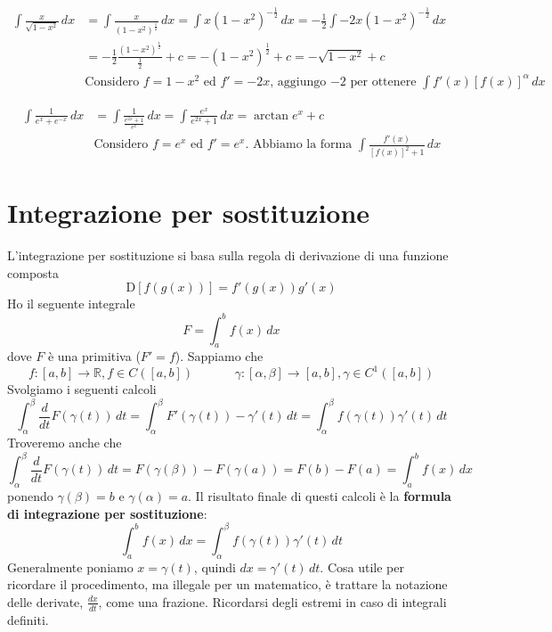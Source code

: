 \documentclass[11pt]{article}
\begin{document}
\begin{align*} \int \frac{x}{\sqrt{1-x^2}}\,dx&=\int \frac{x}{(1-x^2)^{\frac{1}{2}}}\,dx=\int x (1-x^2)^{-\frac{1}{2}}\,dx=-\frac{1}{2} \int -2x (1-x^2)^{-\frac{1}{2}}\,dx\\&=-\frac{1}{2} \frac{(1-x^2)^{\frac{1}{2}}}{\frac{1}{2}}+c=-(1-x^2)^{\frac{1}{2}}+c=-\sqrt{1-x^2}+c\\&\text{Considero $f=1-x^2$ ed $f'=-2x$, aggiungo $-2$ per ottenere $\int f'(x) [f(x)]^\alpha\,dx$}\end{align*}

\begin{align*} \int \frac{1}{e^x+e^{-x}}\,dx&=\int \frac{1}{\frac{e^{2x}+1}{e^x}}\,dx=\int \frac{e^x}{e^{2x}+1}\,dx=\arctan e^x + c\\&\text{Considero $f=e^x$ ed $f'=e^x$. Abbiamo la forma $\int \frac{f'(x)}{[f(x)]^2+1}\,dx$}\end{align*}

\section{Integrazione per sostituzione}
L'integrazione per sostituzione si basa sulla regola di derivazione di una funzione composta
\[\text{D}\left[f(g(x))\right]=f'(g(x))g'(x)\]
Ho il seguente integrale
\[F=\int_a^b f(x)\,dx\]
dove $F$ è una primitiva ($F'=f$). Sappiamo che
\[f:[a,b] \to \mathbb{R}, f\in C\left([a,b]\right)\,\,\,\,\,\,\,\,\,\,\,\,\,\,\,\,\,\,\,\,\gamma: [\alpha,\beta] \to [a,b], \gamma \in C^{1}\left([a,b]\right)\]
Svolgiamo i seguenti calcoli
\[\int_\alpha^\beta \frac{d}{dt}F(\gamma(t))\,dt=\int_\alpha^\beta F'(\gamma(t))-\gamma'(t)\,dt=\int_\alpha^\beta f(\gamma(t))\gamma'(t)\,dt\]
Troveremo anche che
\[\int_\alpha^\beta \frac{d}{dt}F(\gamma(t))\,dt=F(\gamma(\beta))-F(\gamma(a))=F(b)-F(a)=\int_a^b f(x)\,dx\]
ponendo $\gamma(\beta)=b$ e $\gamma(\alpha)=a$. Il risultato finale di questi calcoli è la \textbf{formula di integrazione per sostituzione}:
\large
\[\boxed{\int_a^b f(x)\,dx=\int_\alpha^\beta f(\gamma(t))\gamma'(t)\,dt}\]
\normalsize
Generalmente poniamo $x=\gamma(t)$, quindi $dx=\gamma'(t)\,dt$. Cosa utile per ricordare il procedimento, ma illegale per un matematico, è trattare la notazione delle derivate, $\frac{dx}{dt}$, come una frazione. Ricordarsi degli estremi in caso di integrali definiti. 
\end{document}

